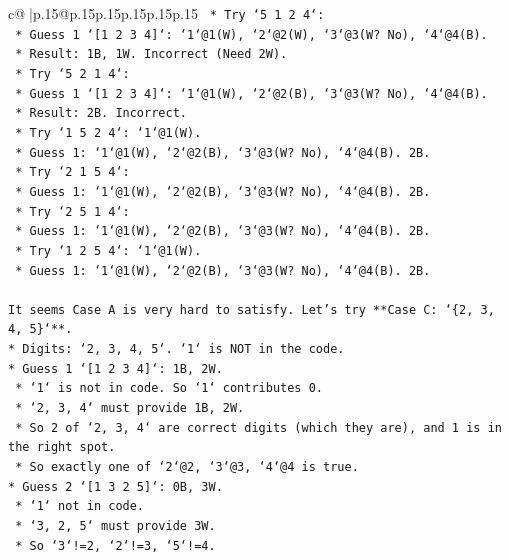 \documentclass{article}
\begin{document}
{\begin{supertabular}{c@{$\;$}|p{.15\linewidth}@{}p{.15\linewidth}p{.15\linewidth}p{.15\linewidth}p{.15\linewidth}p{.15\linewidth}}
{{{\texttt{        *   Try `5 1 2 4`:} \\
\texttt{            *   Guess 1 `{[}1 2 3 4{]}`: `1`@1(W), `2`@2(W), `3`@3(W? No), `4`@4(B).} \\
\texttt{            *   Result: 1B, 1W. Incorrect (Need 2W).} \\
\texttt{        *   Try `5 2 1 4`:} \\
\texttt{            *   Guess 1 `{[}1 2 3 4{]}`: `1`@1(W), `2`@2(B), `3`@3(W? No), `4`@4(B).} \\
\texttt{            *   Result: 2B. Incorrect.} \\
\texttt{        *   Try `1 5 2 4`: `1`@1(W).} \\
\texttt{            *   Guess 1: `1`@1(W), `2`@2(B), `3`@3(W? No), `4`@4(B). 2B.} \\
\texttt{        *   Try `2 1 5 4`:} \\
\texttt{            *   Guess 1: `1`@1(W), `2`@2(B), `3`@3(W? No), `4`@4(B). 2B.} \\
\texttt{        *   Try `2 5 1 4`:} \\
\texttt{            *   Guess 1: `1`@1(W), `2`@2(B), `3`@3(W? No), `4`@4(B). 2B.} \\
\texttt{        *   Try `1 2 5 4`: `1`@1(W).} \\
\texttt{            *   Guess 1: `1`@1(W), `2`@2(B), `3`@3(W? No), `4`@4(B). 2B.} \\
\\ 
\texttt{It seems Case A is very hard to satisfy. Let's try **Case C: `\{2, 3, 4, 5\}`**.} \\
\texttt{*   Digits: `2, 3, 4, 5`. `1` is NOT in the code.} \\
\texttt{*   Guess 1 `{[}1 2 3 4{]}`: 1B, 2W.} \\
\texttt{    *   `1` is not in code. So `1` contributes 0.} \\
\texttt{    *   `2, 3, 4` must provide 1B, 2W.} \\
\texttt{    *   So 2 of `2, 3, 4` are correct digits (which they are), and 1 is in the right spot.} \\
\texttt{    *   So exactly one of `2`@2, `3`@3, `4`@4 is true.} \\
\texttt{*   Guess 2 `{[}1 3 2 5{]}`: 0B, 3W.} \\
\texttt{    *   `1` not in code.} \\
\texttt{    *   `3, 2, 5` must provide 3W.} \\
\texttt{    *   So `3`!=2, `2`!=3, `5`!=4.} \\
}}}
\end{supertabular}}
\end{document}

